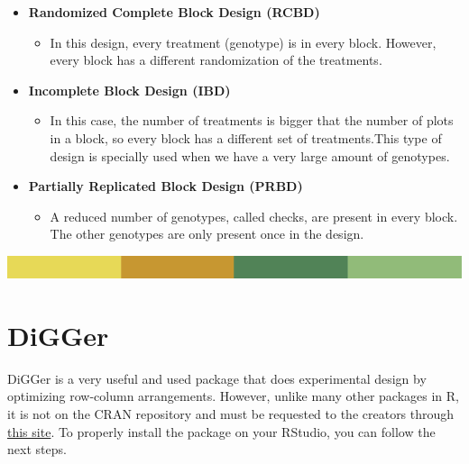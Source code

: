 \documentclass[
]{book}
\providecommand{\tightlist}{%
  \setlength{\itemsep}{0pt}\setlength{\parskip}{0pt}}
\begin{document}
\begin{itemize}
\item
  \textbf{Randomized Complete Block Design (RCBD)}

  \begin{itemize}
  \tightlist
  \item
    In this design, every treatment (genotype) is in every block. However, every block has a different randomization of the treatments.
  \end{itemize}
\item
  \textbf{Incomplete Block Design (IBD)}

  \begin{itemize}
  \tightlist
  \item
    In this case, the number of treatments is bigger that the number of plots in a block, so every block has a different set of treatments.This type of design is specially used when we have a very large amount of genotypes.
  \end{itemize}
\item
  \textbf{Partially Replicated Block Design (PRBD)}

  \begin{itemize}
  \tightlist
  \item
    A reduced number of genotypes, called checks, are present in every block. The other genotypes are only present once in the design.
  \end{itemize}
\end{itemize}

\includegraphics{rsrstrip.png}

\hypertarget{digger}{%
\section{DiGGer}\label{digger}}

DiGGer is a very useful and used package that does experimental design by optimizing row-column arrangements. However, unlike many other packages in R, it is not on the CRAN repository and must be requested to the creators through \href{http://nswdpibiom.org/austatgen/software/}{this site}. To properly install the package on your RStudio, you can follow the next steps.
\end{document}
